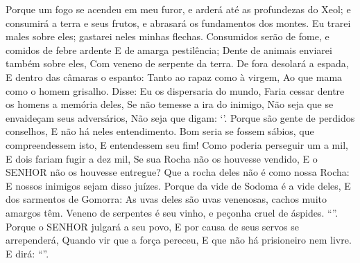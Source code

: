 {{{{  Porque um fogo se acendeu em meu furor, e arderá até as profundezas do Xeol;
 e consumirá a terra e seus frutos, e abrasará os fundamentos dos montes.
  Eu trarei males sobre eles; gastarei neles minhas flechas.
  Consumidos serão de fome, e comidos de febre ardente E de amarga pestilência; Dente de animais enviarei também sobre eles, Com veneno de serpente da terra.
  De fora desolará a espada, E dentro das câmaras o espanto: Tanto ao rapaz como à virgem, Ao que mama como o homem grisalho.
  Disse: Eu os dispersaria do mundo, Faria cessar dentre os homens a memória deles,
  Se não temesse a ira do inimigo, Não seja que se envaideçam seus adversários, Não seja que digam: \enquote*{}.
  Porque são gente de perdidos conselhos, E não há neles entendimento.
  Bom seria se fossem sábios, que compreendessem isto, E entendessem seu fim!}}
  Como poderia perseguir um a mil, E dois fariam fugir a dez mil, Se sua Rocha não os houvesse vendido, E o SENHOR não os houvesse entregue?
  Que a rocha deles não é como nossa Rocha: E nossos inimigos sejam disso juízes.
  Porque da vide de Sodoma é a vide deles, E dos sarmentos de Gomorra: As uvas deles são uvas venenosas, cachos muito amargos têm.
  Veneno de serpentes é seu vinho, e peçonha cruel de áspides.
  \enquote{}.
  Porque o SENHOR julgará a seu povo, E por causa de seus servos se arrependerá, Quando vir que a força pereceu, E que não há prisioneiro nem livre.
  E dirá: \enquote{}.
}}
